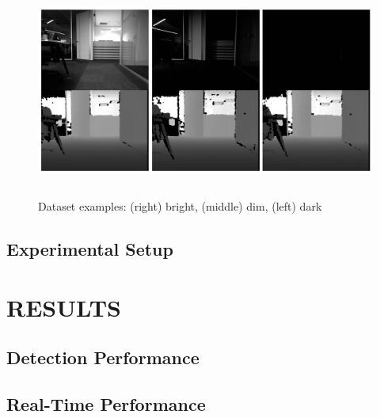 \documentclass[]{spie}  %
\begin{document}
\begin{figure}[!htb]
        \centering
        \includegraphics[trim = 0mm 0mm 0mm 0mm, clip, height=7cm]{figures/dataset_examples.png}
        \caption{Dataset examples: (right) bright, (middle) dim, (left) dark}
        \label{fig:dataset}
\end{figure}

 
\subsection{Experimental Setup}


\section{RESULTS}
\label{sec:results}

\subsection{Detection Performance}

\subsection{Real-Time Performance}
\end{document}
